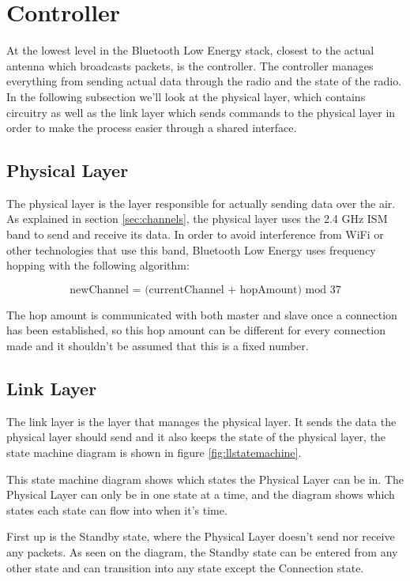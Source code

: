 \documentclass[pdftex,a4paper,12pt,twoside]{report}
\begin{document}
\newpage{}

\section{Controller}
\label{sec:stackController}
At the lowest level in the Bluetooth Low Energy stack, closest to the actual antenna which broadcasts packets, is the controller. The controller manages everything from sending actual data through the radio and the state of the radio. In the following subsection we'll look at the physical layer, which contains circuitry as well as the link layer which sends commands to the physical layer in order to make the process easier through a shared interface.

\subsection{Physical Layer}
\label{subsec:controllerPHY}
The physical layer is the layer responsible for actually sending data over the air. As explained in section \ref{sec:channels}, the physical layer uses the 2.4 GHz ISM band to send and receive its data. In order to avoid interference from WiFi or other technologies that use this band, Bluetooth Low Energy uses frequency hopping with the following algorithm:

\begin{equation*}
\text{newChannel = (currentChannel + hopAmount) mod 37}
\end{equation*}

The hop amount is communicated with both master and slave once a connection has been established, so this hop amount can be different for every connection made and it shouldn't be assumed that this is a fixed number.

\subsection{Link Layer}
\label{subsec:controllerLL}
The link layer is the layer that manages the physical layer. It sends the data the physical layer should send and it also keeps the state of the physical layer, the state machine diagram is shown in figure \ref{fig:llstatemachine}. 

This state machine diagram shows which states the Physical Layer can be in. The Physical Layer can only be in one state at a time, and the diagram shows which states each state can flow into when it's time.

First up is the Standby state, where the Physical Layer doesn't send nor receive any packets. As seen on the diagram, the Standby state can be entered from any other state and can transition into any state except the Connection state.
\end{document}
